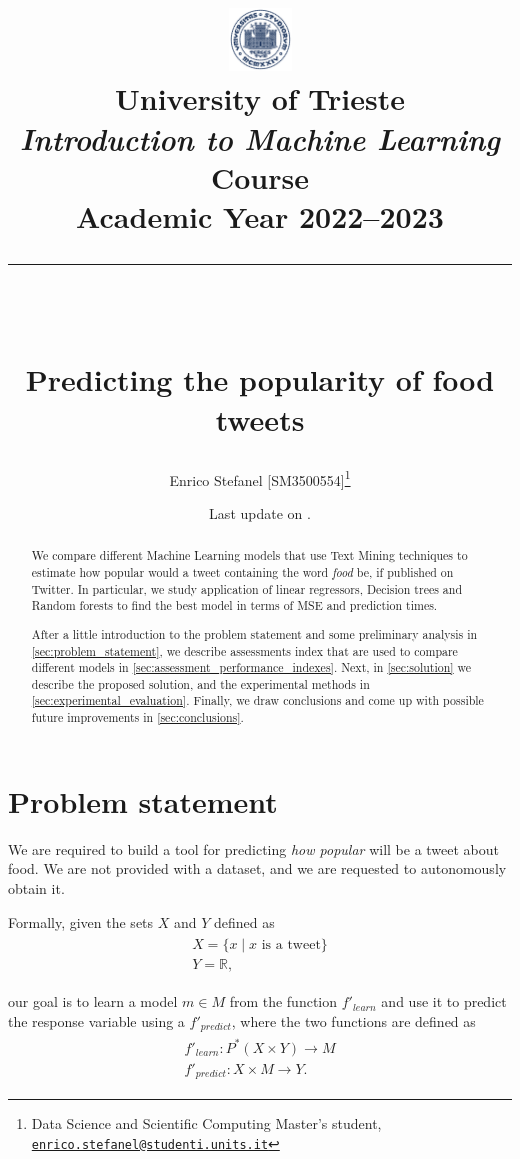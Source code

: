 \documentclass[letterpaper,11pt,english,twocolumn]{article}
\title{
	\begin{center}
  		\includegraphics[width=0.125\textwidth]{./images/units-logo.pdf}\\
  		\smallskip
  		\Large {University of Trieste}\\
		\smallskip
  		\large \textit{Introduction to Machine Learning} Course\\
		\smallskip
		\small Academic Year 2022--2023\\
  		\rule{9cm}{.4pt}\\
		\medskip
  	\end{center}
	Predicting the popularity of food tweets
}
\author{
	Enrico Stefanel [SM3500554]\thanks{Data Science and Scientific Computing Master's student, \href{mailto:enrico.stefanel@studenti.units.it}{\texttt{enrico.stefanel@studenti.units.it}}}
}
\date{\footnotesize Last update on \DTMuse{currzulu}.}
\begin{document}
\maketitle

\begin{abstract}
We compare different Machine Learning models that use Text Mining techniques to estimate how popular would a tweet containing the word \textit{food} be, if published on Twitter. In particular, we study application of linear regressors, Decision trees and Random forests to find the best model in terms of MSE and prediction times.

After a little introduction to the problem statement and some preliminary analysis in \autoref{sec:problem_statement}, we describe assessments index that are used to compare different models in \autoref{sec:assessment_performance_indexes}. Next, in \autoref{sec:solution} we describe the proposed solution, and the experimental methods in \autoref{sec:experimental_evaluation}. Finally, we draw conclusions and come up with possible future improvements in \autoref{sec:conclusions}.
\end{abstract}


\section{Problem statement}
\label{sec:problem_statement}
We are required to build a tool for predicting \textit{how popular} will be a tweet about food.
We are not provided with a dataset, and we are requested to autonomously obtain it.

Formally, given the sets $X$ and $Y$ defined as
\begin{align*}
\begin{gathered}
	X = \{x \mid x \text{ is a tweet}\}\\
	Y = \mathbb{R},
\end{gathered}
\end{align*}

our goal is to learn a model $m \in M$ from the function $f'_{learn}$ and use it to predict the response variable using a $f'_{predict}$, where the two functions are defined as
\begin{align*}
\begin{gathered}
	f'_{learn}: P^{*}(X \times Y) \rightarrow M\\
	f'_{predict} : X \times M \rightarrow Y.
\end{gathered}
\end{align*}
\end{document}
